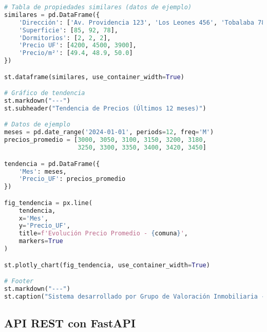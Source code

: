 \documentclass[11pt,a4paper]{article}
\begin{document}
\begin{lstlisting}[language=Python]
# Tabla de propiedades similares (datos de ejemplo)
similares = pd.DataFrame({
    'Dirección': ['Av. Providencia 123', 'Los Leones 456', 'Tobalaba 789'],
    'Superficie': [85, 92, 78],
    'Dormitorios': [2, 2, 2],
    'Precio UF': [4200, 4500, 3900],
    'Precio/m²': [49.4, 48.9, 50.0]
})

st.dataframe(similares, use_container_width=True)

# Gráfico de tendencia
st.markdown("---")
st.subheader("Tendencia de Precios (Últimos 12 meses)")

# Datos de ejemplo
meses = pd.date_range('2024-01-01', periods=12, freq='M')
precios_promedio = [3000, 3050, 3100, 3150, 3200, 3180, 
                    3250, 3300, 3350, 3400, 3420, 3450]

tendencia = pd.DataFrame({
    'Mes': meses,
    'Precio_UF': precios_promedio
})

fig_tendencia = px.line(
    tendencia,
    x='Mes',
    y='Precio_UF',
    title=f'Evolución Precio Promedio - {comuna}',
    markers=True
)

st.plotly_chart(fig_tendencia, use_container_width=True)

# Footer
st.markdown("---")
st.caption("Sistema desarrollado por Grupo de Valoración Inmobiliaria - Geoinformática 2025")
\end{lstlisting}

\subsection{API REST con FastAPI}
\end{document}
